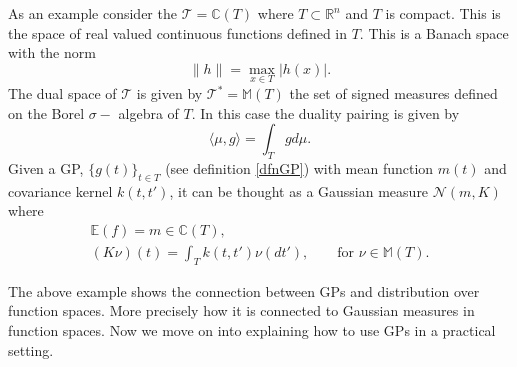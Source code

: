 \documentclass[12pt]{book}
\newcommand{\E}{\mathbb{E}} %
\newcommand{\tvs}{\mathscr{T}} %
\begin{document}
As an example consider the  $\tvs=\mathbb{C}(T)$ where 
$T\subset\mathbb{R}^{n}$ and $T$ is compact. This is the  space of real valued continuous functions 
defined in 
$T$. This  is a Banach
space with the norm \cite{bressan1900lecture}
\begin{equation*}
\|h\|=\max_{x\in T}|h(x)|.
\end{equation*}
The dual space of $\tvs$ is given by $\tvs^{*}=\mathbb{M}(T)$ the set of signed measures defined on 
the Borel $\sigma-$ algebra of  $T$. In this 
case the duality pairing is given by 
\begin{equation*}
\langle\mu,g \rangle=\int_{T}gd\mu.
\end{equation*}
Given a GP,  $\{g(t)\}_{t\in T}$ (see definition \ref{dfnGP}) with mean function $m(t)$ and 
covariance kernel $k(t,t')$, it can be thought as a Gaussian measure $\mathcal{N}(m,K)$
where
\cite{lifshits2012lectures} 
\begin{eqnarray*}
\E(f)=m\in\mathbb{C}(T), \\
(K\nu)(t)=\int_{T}k(t,t')\nu(dt'),\qquad\text{for }\nu\in\mathbb{M}(T).
\end{eqnarray*}

The above example shows the connection between GPs and distribution over function spaces. More
precisely how it is connected to Gaussian measures in function spaces. Now we move on
into explaining how to use GPs in a practical setting.
\end{document}
